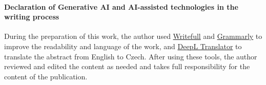 \documentclass[twoside]{ctuthesis}
\begin{document}




\maketitle


\glsresetall







\paragraph{Declaration of Generative AI and AI-assisted technologies in the writing process}


During the preparation of this work, the author used \href{https://www.writefull.com/}{Writefull} and \href{https://grammarly.com/}{Grammarly} to improve the readability and language of the work, and \href{https://www.deepl.com/}{DeepL Translator} to translate the abstract from English to Czech.
After using these tools, the author reviewed and edited the content as needed and takes full responsibility for the content of the publication.
\end{document}
